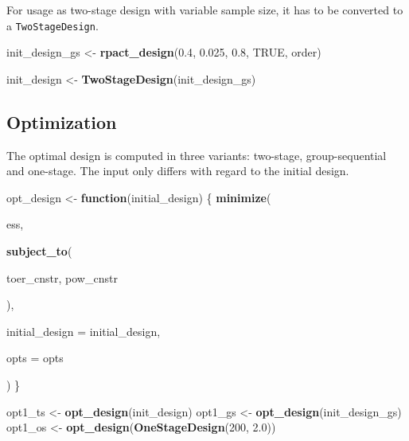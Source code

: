 \documentclass[]{book}
\newenvironment{Shaded}{\begin{snugshade}}{\end{snugshade}}
\newcommand{\ControlFlowTok}[1]{\textcolor[rgb]{0.13,0.29,0.53}{\textbf{#1}}}
\newcommand{\DataTypeTok}[1]{\textcolor[rgb]{0.13,0.29,0.53}{#1}}
\newcommand{\DecValTok}[1]{\textcolor[rgb]{0.00,0.00,0.81}{#1}}
\newcommand{\FloatTok}[1]{\textcolor[rgb]{0.00,0.00,0.81}{#1}}
\newcommand{\KeywordTok}[1]{\textcolor[rgb]{0.13,0.29,0.53}{\textbf{#1}}}
\newcommand{\NormalTok}[1]{#1}
\newcommand{\OtherTok}[1]{\textcolor[rgb]{0.56,0.35,0.01}{#1}}
\newcommand{\StringTok}[1]{\textcolor[rgb]{0.31,0.60,0.02}{#1}}
\begin{document}
For usage as two-stage design with variable sample size, it has to
be converted to a \texttt{TwoStageDesign}.

\begin{Shaded}
\begin{Highlighting}[]
\NormalTok{init_design_gs <-}\StringTok{ }\KeywordTok{rpact_design}\NormalTok{(}\FloatTok{0.4}\NormalTok{, }\FloatTok{0.025}\NormalTok{, }\FloatTok{0.8}\NormalTok{, }\OtherTok{TRUE}\NormalTok{, order)}

\NormalTok{init_design    <-}\StringTok{ }\KeywordTok{TwoStageDesign}\NormalTok{(init_design_gs)}
\end{Highlighting}
\end{Shaded}

\hypertarget{optimization}{%
\subsection{Optimization}\label{optimization}}

The optimal design is computed in three variants: two-stage, group-sequential
and one-stage.
The input only differs with regard to the initial design.

\begin{Shaded}
\begin{Highlighting}[]
\NormalTok{opt_design <-}\StringTok{ }\ControlFlowTok{function}\NormalTok{(initial_design) \{}
    \KeywordTok{minimize}\NormalTok{(}
        
\NormalTok{        ess,}
        
        \KeywordTok{subject_to}\NormalTok{(}
            
\NormalTok{            toer_cnstr,}
\NormalTok{            pow_cnstr}
            
\NormalTok{        ),}
        
        \DataTypeTok{initial_design =}\NormalTok{ initial_design,}
        
        \DataTypeTok{opts =}\NormalTok{ opts}
        
\NormalTok{    )}
\NormalTok{\}}

\NormalTok{opt1_ts <-}\StringTok{ }\KeywordTok{opt_design}\NormalTok{(init_design)}
\NormalTok{opt1_gs <-}\StringTok{ }\KeywordTok{opt_design}\NormalTok{(init_design_gs)}
\NormalTok{opt1_os <-}\StringTok{ }\KeywordTok{opt_design}\NormalTok{(}\KeywordTok{OneStageDesign}\NormalTok{(}\DecValTok{200}\NormalTok{, }\FloatTok{2.0}\NormalTok{))}
\end{Highlighting}
\end{Shaded}
\end{document}

